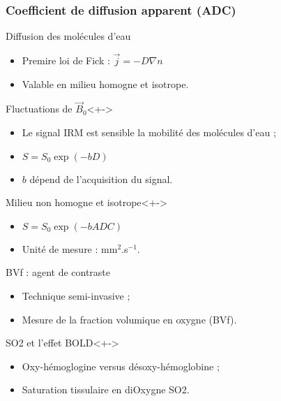\begin{frame}
\frametitle{Coefficient de diffusion apparent (ADC)}
\begin{block}{Diffusion des mol\'ecules d'eau}
\begin{itemize}
\item<+-> Premire loi de Fick : $\vec{j}=-D\nabla n$
\item<+-> Valable en milieu homogne et isotrope.
\end{itemize}
\end{block}

\begin{block}{Fluctuations de $\vec{B}_0$}<+->
\begin{itemize}
\item<+-> Le signal IRM est sensible  la mobilit\'e des mol\'ecules d'eau ;
\item<+-> $S=S_0\exp\left(-bD\right)$
\item<+-> $b$ d\'epend de l'acquisition du signal.
\end{itemize}
\end{block}

\begin{block}{Milieu non homogne et isotrope}<+->
\begin{itemize}
\item<+-> $S=S_0\exp\left(-bADC\right)$
\item<+-> Unit\'e de mesure : mm${}^2$.s${}^{-1}$.
\end{itemize}
\end{block}
\end{frame}

\begin{frame}
\begin{block}{BVf : agent de contraste}
\begin{itemize}
\item<+-> Technique semi-invasive ;
\item<+-> Mesure de la fraction volumique en oxygne (BVf).
\end{itemize}
\end{block}

\begin{block}{SO2 et l'effet BOLD}<+->
\begin{itemize}
\item<+-> Oxy-h\'emoglogine versus d\'esoxy-h\'emoglobine ;
\item<+-> Saturation tissulaire en diOxygne SO2.
\end{itemize}
\end{block}
\end{frame}

